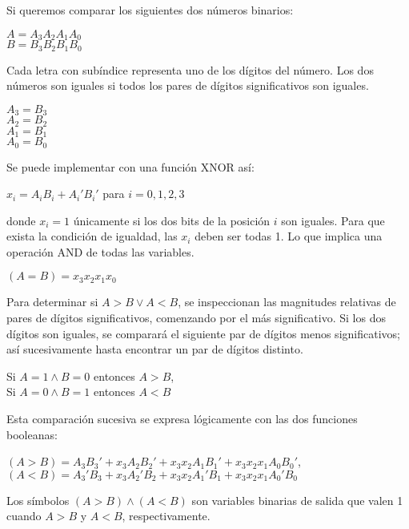\begin{flushleft}
    Si queremos comparar los siguientes dos n\'{u}meros binarios:
\end{flushleft}
\begin{center}
    $A = A_3A_2A_1A_0$ \\
    $B = B_3B_2B_1B_0$
\end{center}
\begin{flushleft}
    Cada letra con sub\'{i}ndice representa uno de los d\'{i}gitos del n\'{u}mero. Los dos n\'{u}meros son
    iguales si todos los pares de d\'{i}gitos significativos son iguales.
\end{flushleft}
\begin{center}
    $A_3 = B_3$ \\
    $A_2 = B_2$ \\
    $A_1 = B_1$ \\
    $A_0 = B_0$
\end{center}
\begin{flushleft}
    Se puede implementar con una funci\'{o}n XNOR as\'{i}:
\end{flushleft}
\begin{center}
    $x_i = A_iB_i + A_i'B_i'$ \quad para $i = 0, 1, 2, 3$
\end{center}
\begin{flushleft}
    donde $x_i = 1$ \'{u}nicamente si los dos bits de la posici\'{o}n $i$ son iguales.
    Para que exista la condici\'{o}n de igualdad, las $x_i$ deben ser todas 1. Lo que implica una
    operaci\'{o}n AND de todas las variables.
\end{flushleft}
\begin{center}
    $(A = B) = x_3x_2x_1x_0$
\end{center}
\begin{flushleft}
    Para determinar si $A > B \vee A < B$, se inspeccionan las magnitudes relativas de pares de d\'{i}gitos
    significativos, comenzando por el m\'{a}s significativo. Si los dos d\'{i}gitos son iguales, se comparar\'{a}
    el siguiente par de d\'{i}gitos menos significativos; as\'{i} sucesivamente hasta encontrar un par de d\'{i}gitos
    distinto.
\end{flushleft}
\begin{center}
    Si $A = 1 \wedge B = 0$ \quad entonces \quad $A > B$, \\
    Si $A = 0 \wedge B = 1$ \quad entonces \quad $A < B$
\end{center}
\begin{flushleft}
    Esta comparaci\'{o}n sucesiva se expresa l\'{o}gicamente con las dos funciones booleanas:
\end{flushleft}
\begin{center}
    $(A > B) = A_3B_3' + x_3A_2B_2' + x_3x_2A_1B_1' + x_3x_2x_1A_0B_0'$, \\
    $(A < B) = A_3'B_3 + x_3A_2'B_2 + x_3x_2A_1'B_1 + x_3x_2x_1A_0'B_0$
\end{center}
\begin{flushleft}
    Los s\'{i}mbolos $(A > B) \wedge (A < B)$ son variables binarias de salida que valen 1 cuando $A > B$ y $A < B$,
    respectivamente.
\end{flushleft}

